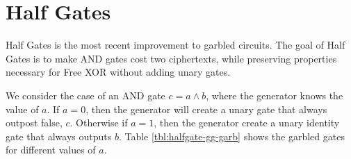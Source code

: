 
\section{Half Gates}
Half Gates is the most recent improvement to garbled circuits.
The goal of Half Gates is to make AND gates cost two ciphertexts, while preserving properties necessary for Free XOR without adding unary gates. 

We consider the case of an AND gate $c = a \wedge b$, where the generator knows the value of $a$. 
If $a = 0$, then the generator will create a unary gate that always outpost false, $c$. 
Otherwise if $a = 1$, then the generator create a unary identity gate that always outputs $b$. 
Table \ref{tbl:halfgate-gg-garb} shows the garbled gates for different values of $a$. 

